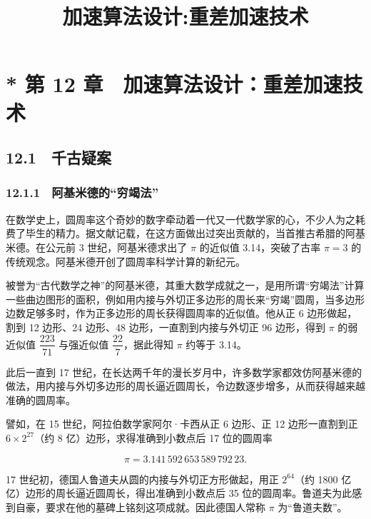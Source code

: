 \documentclass[
  10pt,
  fontset=fandol]{ctexart}
\title{加速算法设计:重差加速技术}
\author{}
\date{}
\begin{document}
\maketitle

\section{* 第 12 章　加速算法设计：重差加速技术}\label{ux7b2c-12-ux7ae0-ux52a0ux901fux7b97ux6cd5ux8bbeux8ba1ux91cdux5deeux52a0ux901fux6280ux672f}

\subsection{12.1　千古疑案}\label{ux5343ux53e4ux7591ux6848}

\subsubsection{12.1.1　阿基米德的``穷竭法''}\label{ux963fux57faux7c73ux5fb7ux7684ux7a77ux7aedux6cd5}

在数学史上，圆周率这个奇妙的数字牵动着一代又一代数学家的心，不少人为之耗费了毕生的精力。据文献记载，在这方面做出过突出贡献的，当首推古希腊的阿基米德。在公元前 3 世纪，阿基米德求出了 \(\pi\) 的近似值 3.14，突破了古率 \(\pi=3\) 的传统观念。阿基米德开创了圆周率科学计算的新纪元。

被誉为``古代数学之神''的阿基米德，其重大数学成就之一，是用所谓``穷竭法''计算一些曲边图形的面积，例如用内接与外切正多边形的周长来``穷竭''圆周，当多边形边数足够多时，作为正多边形的周长获得圆周率的近似值。他从正 6 边形做起，割到 12 边形、24 边形、48 边形，一直割到内接与外切正 96 边形，得到 \(\pi\) 的弱近似值 \(\dfrac{223}{71}\) 与强近似值 \(\dfrac{22}{7}\)，据此得知 \(\pi\) 约等于 3.14。

此后一直到 17 世纪，在长达两千年的漫长岁月中，许多数学家都效仿阿基米德的做法，用内接与外切多边形的周长逼近圆周长，令边数逐步增多，从而获得越来越准确的圆周率。

譬如，在 15 世纪，阿拉伯数学家阿尔·卡西从正 6 边形、正 12 边形一直割到正 \(6\times2^{27}\)（约 8 亿）边形，求得准确到小数点后 17 位的圆周率

\[
\pi=3.141\,592\,653\,589\,792\,23.
\]

17 世纪初，德国人鲁道夫从圆的内接与外切正方形做起，用正 \(2^{64}\)（约 1800 亿亿）边形的周长逼近圆周长，得出准确到小数点后 35 位的圆周率。鲁道夫为此感到自豪，要求在他的墓碑上铭刻这项成就。因此德国人常称 \(\pi\) 为``鲁道夫数''。
\end{document}
